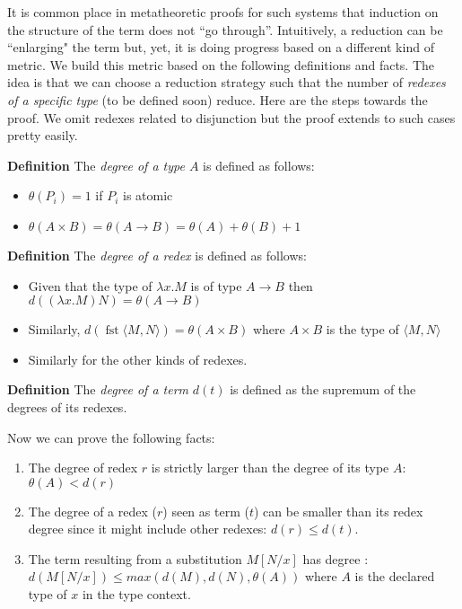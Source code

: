 It is common place in metatheoretic proofs for such systems that induction on the structure of the term does not ``go through''. Intuitively, a reduction can be ``enlarging" the term but, yet, it is doing progress based on a different kind of metric. We build this metric based on the following definitions and facts. The idea is that we can choose a reduction strategy such that the number of \textit{redexes of a specific type} (to be defined soon) reduce. Here are the steps towards the proof. We omit redexes related to disjunction but the proof extends to such cases pretty easily.


\begin{mdframed}
	\textbf{Definition}
	The \textit{degree of a type $A$} is defined as follows:
	\begin{itemize}
		\item $\theta(P_i)=1$ if $P_i$ is atomic
		\item $\theta(A\times B)=\theta(A \rightarrow B)= \theta(A)+\theta(B)+1$
	\end{itemize}
\end{mdframed}
\begin{mdframed}
	\textbf{Definition}
	The \textit{degree of a redex} is defined as follows:
	\begin{itemize}
		\item  Given that the type of $\lambda x. M$ is of type $A\rightarrow B$ then  $d((\lambda x. M)N)=\theta(A\rightarrow B)$
		\item Similarly, $d(\operatorname{fst}\langle M, N\rangle)=\theta(A\times B)$
		where $A\times B$ is the type of $\langle M, N\rangle$
		
		\item Similarly for the other kinds of redexes.
	\end{itemize}
\end{mdframed}
\begin{mdframed}
	\textbf{Definition}
	The \textit{degree of a term} $d(t)$ is defined as the supremum of the degrees of its redexes.
\end{mdframed}
Now we can prove the following facts:
\begin{theorem}
	\begin{mdframed}
\begin{enumerate}
	\item The degree of redex $r$ is strictly larger than the degree of its type $A$: 
	$\theta(A)<d(r)$
	\item The degree of a redex ($r$) seen as term ($t$)  can be smaller than its redex degree since it might include other redexes: $d(r)\le d(t)$.
	\item The term resulting from a substitution $M[N/x]$  has degree : $d(M[N/x])\le max(d(M),d(N),\theta(A))$ where $A$ is the declared type of $x$ in the type context.
\end{enumerate}
	\end{mdframed}
\end{theorem}
